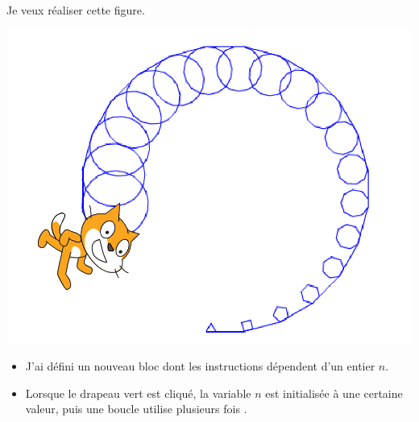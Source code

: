 \documentclass[class=report,crop=false, 12pt]{standalone}
\begin{document}
\begin{enigme}

Je veux réaliser cette figure.
\begin{center}
  \includegraphics[scale=\scaleecran,scale=1.3]{ecran-11-eg2} 
\end{center}


\begin{minipage}{0.49\textwidth}
\begin{itemize}
  \item J'ai défini un nouveau bloc  dont les instructions dépendent d'un entier $n$.

\bigskip
  
  \item Lorsque le drapeau vert est cliqué, la variable $n$ est initialisée à une certaine valeur, puis une boucle utilise plusieurs fois .
  
\bigskip
  

\end{itemize}
\end{minipage}
\end{enigme}
\end{document}

